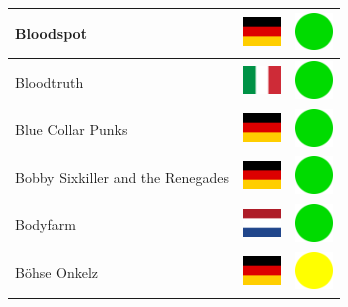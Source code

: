 \documentclass[12pt, a4paper, twoside]{report}
\begin{document}
\begin{center}
\begin{longtable}{|p{5cm}|p{2cm}|p{2cm}|}
 Bloodspot                                                  & \includegraphics[width=1cm]{../4x3/de} &   \includegraphics[width=1cm]{../likes/y} \\ \hline
 Bloodtruth                                                 & \includegraphics[width=1cm]{../4x3/it} &   \includegraphics[width=1cm]{../likes/y} \\ \hline
 Blue Collar Punks                                          & \includegraphics[width=1cm]{../4x3/de} &   \includegraphics[width=1cm]{../likes/y} \\ \hline
 Bobby Sixkiller and the Renegades                          & \includegraphics[width=1cm]{../4x3/de} &   \includegraphics[width=1cm]{../likes/y} \\ \hline
 Bodyfarm                                                   & \includegraphics[width=1cm]{../4x3/nl} &   \includegraphics[width=1cm]{../likes/y} \\ \hline
 Böhse Onkelz                                               & \includegraphics[width=1cm]{../4x3/de} &   \includegraphics[width=1cm]{../likes/m} \\ \hline

\end{longtable}
\end{center}
\end{document}
